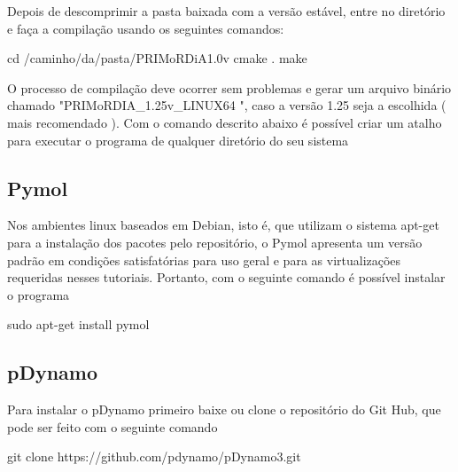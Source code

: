 \documentclass[a4paper,11pt]{refart}
\begin{document}
	Depois de descomprimir a pasta baixada com a versão estável, entre no diretório e faça a compilação usando os seguintes comandos: 
	
\hspace*{-\leftmarginwidth}
\begin{minipage}{\fullwidth}
\begin{commandshell}cd /caminho/da/pasta/PRIMoRDiA1.0v
cmake .
make
\end{commandshell}
\end{minipage}
	
	O processo de compilação deve ocorrer sem problemas e gerar um arquivo binário chamado "PRIMoRDIA\_1.25v\_LINUX64 ", caso a versão 1.25 seja a escolhida ( mais recomendado ).
	Com o comando descrito abaixo é possível criar um atalho para executar o programa de qualquer diretório do seu sistema
	
	\subsection{Pymol} 
	
	Nos ambientes linux baseados em Debian, isto é, que utilizam o sistema apt-get para a instalação dos pacotes pelo repositório, o Pymol apresenta um versão padrão em condições satisfatórias para uso geral e para as virtualizações requeridas nesses tutoriais. Portanto, com o seguinte comando é possível instalar o programa
	
	\hspace*{-\leftmarginwidth}
	\begin{minipage}{\fullwidth}
		\begin{commandshell}sudo apt-get install pymol\end{commandshell}
	\end{minipage}
	
	\subsection{pDynamo}
	
	Para instalar o pDynamo primeiro baixe ou clone o repositório do Git Hub, que pode ser feito com o seguinte comando
	
	
\hspace*{-\leftmarginwidth}
\begin{minipage}{\fullwidth}
\begin{commandshell}git clone https://github.com/pdynamo/pDynamo3.git\end{commandshell}
\end{minipage}	
\end{document}
